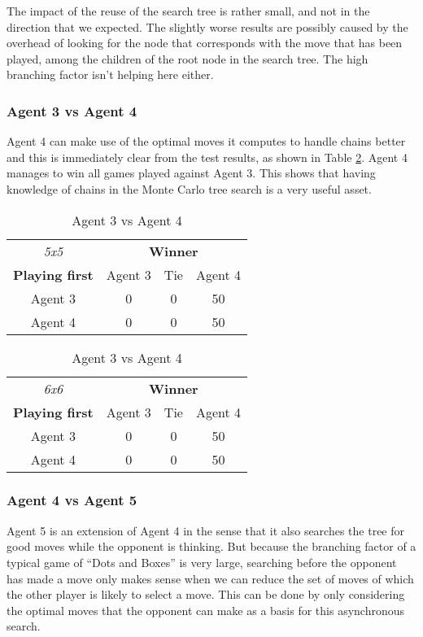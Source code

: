 The impact of the reuse of the search tree is rather small, and not in the direction that we expected. The slightly worse results are possibly caused by the overhead of looking for the node that corresponds with the move that has been played, among the children of the root node in the search tree. The high branching factor isn't helping here either.


\subsubsection{Agent 3 vs Agent 4}
Agent 4 can make use of the optimal moves it computes to handle chains better and this is immediately clear from the test results, as shown in Table \ref{result:Ag3vsAg4}. Agent 4 manages to win all games played against Agent 3. This shows that having knowledge of chains in the Monte Carlo tree search is a very useful asset.

\begin{table}[!h]
	\centering
	\begin{tabular}{c | c | c | c}
		\textit{5x5} & \multicolumn{3}{c}{\textbf{Winner}}        \\
		\textbf{Playing first} & Agent 3 & Tie & Agent 4 \\ \hline
		Agent 3 & 0 & 0 & 50 \\ \hline
		Agent 4 & 0 & 0 & 50
	\end{tabular}
	\quad
	\begin{tabular}{c | c | c | c}
		\textit{6x6} & \multicolumn{3}{c}{\textbf{Winner}}        \\
		\textbf{Playing first} & Agent 3 & Tie & Agent 4 \\ \hline
		Agent 3 & 0 & 0 & 50 \\ \hline
		Agent 4 & 0 & 0 & 50
	\end{tabular}
	\caption{\label{result:Ag3vsAg4}Agent 3 vs Agent 4}
\end{table}


\subsubsection{Agent 4 vs Agent 5}
Agent 5 is an extension of Agent 4 in the sense that it also searches the tree for good moves while the opponent is thinking. But because the branching factor of a typical game of ``Dots and Boxes'' is very large, searching before the opponent has made a move only makes sense when we can reduce the set of moves of which the other player is likely to select a move. This can be done by only considering the optimal moves that the opponent can make as a basis for this asynchronous search.

